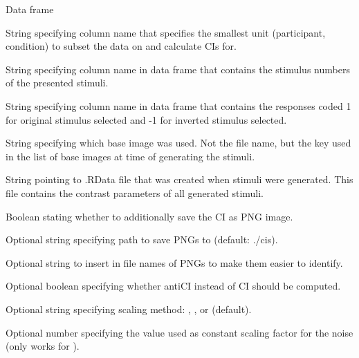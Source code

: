 \documentclass[letterpaper]{book}
\begin{document}
\begin{Arguments}
\begin{ldescription}
\item[\code{data}] Data frame

\item[\code{by}] String specifying column name that specifies the smallest unit (participant, condition) to subset the data on and calculate CIs for.

\item[\code{stimuli}] String specifying column name in data frame that contains the stimulus numbers of the presented stimuli.

\item[\code{responses}] String specifying column name in data frame that contains the responses coded 1 for original stimulus selected and -1 for inverted stimulus selected.

\item[\code{baseimage}] String specifying which base image was used. Not the file name, but the key used in the list of base images at time of generating the stimuli.

\item[\code{rdata}] String pointing to .RData file that was created when stimuli were generated. This file contains the contrast parameters of all generated stimuli.

\item[\code{save\_as\_png}] Boolean stating whether to additionally save the CI as PNG image.

\item[\code{targetpath}] Optional string specifying path to save PNGs to (default: ./cis).

\item[\code{label}] Optional string to insert in file names of PNGs to make them easier to identify.

\item[\code{antiCI}] Optional boolean specifying whether antiCI instead of CI should be computed.

\item[\code{scaling}] Optional string specifying scaling method: , ,   or  (default).

\item[\code{constant}] Optional number specifying the value used as constant scaling factor for the noise (only works for ).
\end{ldescription}
\end{Arguments}
\end{document}
